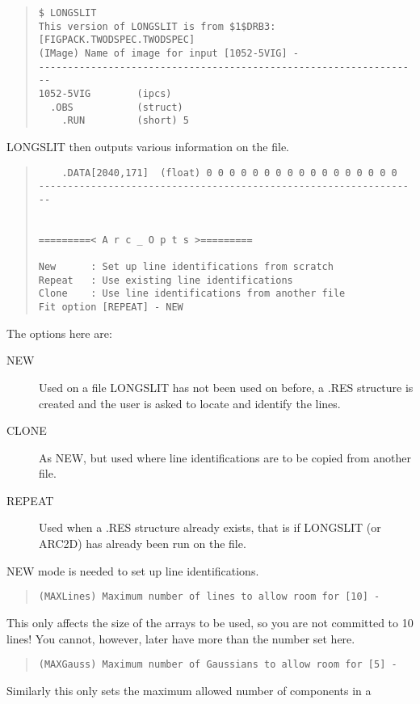 \begin{quote}\begin{verbatim}
$ LONGSLIT 
This version of LONGSLIT is from $1$DRB3:[FIGPACK.TWODSPEC.TWODSPEC]
(IMage) Name of image for input [1052-5VIG] -
------------------------------------------------------------------
1052-5VIG        (ipcs)
  .OBS           (struct)
    .RUN         (short) 5
\end{verbatim}\end{quote}
LONGSLIT then outputs various information on the file.
\begin{quote}\begin{verbatim}
    .DATA[2040,171]  (float) 0 0 0 0 0 0 0 0 0 0 0 0 0 0 0 0 0
------------------------------------------------------------------

 
=========< A r c _ O p t s >=========
 
New      : Set up line identifications from scratch
Repeat   : Use existing line identifications
Clone    : Use line identifications from another file
Fit option [REPEAT] - NEW
\end{verbatim}\end{quote}
The options here are:
\begin{description}
\item[NEW] Used on a file LONGSLIT has not been used on before, a
.RES structure is created and the user is asked to locate and identify
the lines.
\item[CLONE] As NEW, but used where line identifications are to be
copied from another file.
\item[REPEAT] Used when a .RES structure already exists, that is if
LONGSLIT (or ARC2D) has already been run on the file.
\end{description}
NEW mode is needed to set up line identifications.
\begin{quote}\begin{verbatim}
(MAXLines) Maximum number of lines to allow room for [10] -
\end{verbatim}\end{quote}
This only affects the size of the arrays to be used, so you are not
committed to 10 lines! You cannot, however, later have more than the
number set here.
\begin{quote}\begin{verbatim}
(MAXGauss) Maximum number of Gaussians to allow room for [5] -
\end{verbatim}\end{quote}
Similarly this only sets the maximum allowed number of components in a
